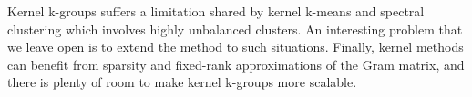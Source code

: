 \documentclass[10pt,journal,compsoc]{IEEEtran}
\begin{document}
Kernel k-groups suffers a limitation shared by kernel k-means and spectral
clustering which involves highly unbalanced
clusters. An interesting problem  that we leave open 
is to extend the method to such 
situations.
Finally, kernel methods can benefit from sparsity and
fixed-rank approximations of the Gram matrix, and there is plenty
of room to make kernel k-groups more scalable.










\appendix  %

%



\end{document}
